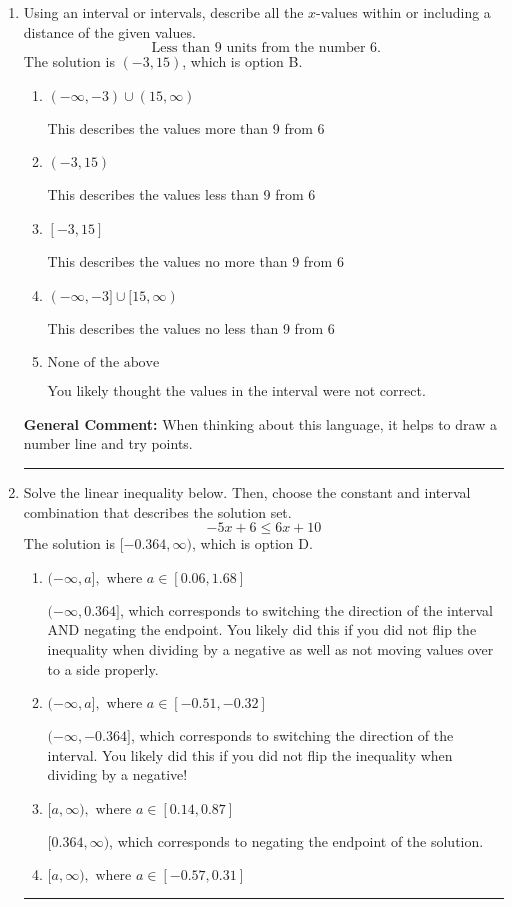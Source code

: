 \documentclass{extbook}[14pt]
\newcommand{\litem}[1]{\item #1

\rule{\textwidth}{0.4pt}}
\begin{document}
\begin{enumerate}\litem{
Using an interval or intervals, describe all the $x$-values within or including a distance of the given values.
\[ \text{ Less than } 9 \text{ units from the number } 6. \]The solution is \( (-3, 15) \), which is option B.\begin{enumerate}[label=\Alph*.]
\item \( (-\infty, -3) \cup (15, \infty) \)

This describes the values more than 9 from 6
\item \( (-3, 15) \)

This describes the values less than 9 from 6
\item \( [-3, 15] \)

This describes the values no more than 9 from 6
\item \( (-\infty, -3] \cup [15, \infty) \)

This describes the values no less than 9 from 6
\item \( \text{None of the above} \)

You likely thought the values in the interval were not correct.
\end{enumerate}

\textbf{General Comment:} When thinking about this language, it helps to draw a number line and try points.
}
\litem{
Solve the linear inequality below. Then, choose the constant and interval combination that describes the solution set.
\[ -5x + 6 \leq 6x + 10 \]The solution is \( [-0.364, \infty) \), which is option D.\begin{enumerate}[label=\Alph*.]
\item \( (-\infty, a], \text{ where } a \in [0.06, 1.68] \)

 $(-\infty, 0.364]$, which corresponds to switching the direction of the interval AND negating the endpoint. You likely did this if you did not flip the inequality when dividing by a negative as well as not moving values over to a side properly.
\item \( (-\infty, a], \text{ where } a \in [-0.51, -0.32] \)

 $(-\infty, -0.364]$, which corresponds to switching the direction of the interval. You likely did this if you did not flip the inequality when dividing by a negative!
\item \( [a, \infty), \text{ where } a \in [0.14, 0.87] \)

 $[0.364, \infty)$, which corresponds to negating the endpoint of the solution.
\item \( [a, \infty), \text{ where } a \in [-0.57, 0.31] \)


\end{enumerate}}
\end{enumerate}
\end{document}
